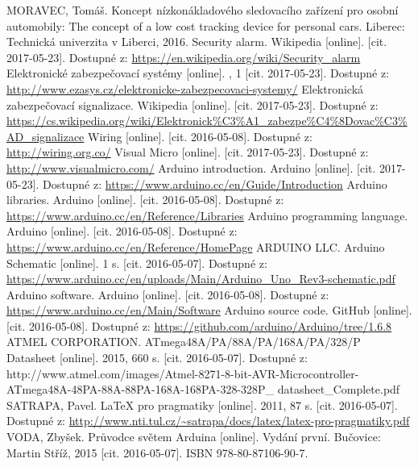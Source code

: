 \documentclass[FM,MP]{tulthesis}  %
\begin{document}
\begin{thebibliography}{10}
MORAVEC, Tomáš. Koncept nízkonákladového sledovacího zařízení pro osobní automobily: The concept of a low cost tracking device for personal cars. Liberec: Technická univerzita v Liberci, 2016.
Security alarm. Wikipedia [online]. [cit. 2017-05-23]. Dostupné z: \url{https://en.wikipedia.org/wiki/Security_alarm}
Elektronické zabezpečovací systémy [online]. , 1 [cit. 2017-05-23]. Dostupné z: \url{http://www.ezasys.cz/elektronicke-zabezpecovaci-systemy/}
Elektronická zabezpečovací signalizace. Wikipedia [online]. [cit. 2017-05-23]. Dostupné z: \url{https://cs.wikipedia.org/wiki/Elektronick\%C3\%A1\_zabezpe\%C4\%8Dovac\%C3\%AD_signalizace}
Wiring [online]. [cit. 2016-05-08]. Dostupné z: \url{http://wiring.org.co/}
Visual Micro [online]. [cit. 2017-05-23]. Dostupné z: \url{http://www.visualmicro.com/}
Arduino introduction. Arduino [online]. [cit. 2017-05-23]. Dostupné z: \url{https://www.arduino.cc/en/Guide/Introduction}
Arduino libraries. Arduino [online]. [cit. 2016-05-08]. Dostupné z: \url{https://www.arduino.cc/en/Reference/Libraries}
Arduino programming language. Arduino [online]. [cit. 2016-05-08]. Dostupné z: \url{https://www.arduino.cc/en/Reference/HomePage}
ARDUINO LLC. Arduino Schematic [online]. 1 s. [cit. 2016-05-07]. Dostupné z: \url{https://www.arduino.cc/en/uploads/Main/Arduino\_Uno\_Rev3-schematic.pdf}
 Arduino software. Arduino [online]. [cit. 2016-05-08]. Dostupné z: \url{https://www.arduino.cc/en/Main/Software}
Arduino source code. GitHub [online]. [cit. 2016-05-08]. Dostupné z: \url{https://github.com/arduino/Arduino/tree/1.6.8}
ATMEL CORPORATION. ATmega48A/PA/88A/PA/168A/PA/328/P Datasheet [online]. 2015, 660 s. [cit. 2016-05-07]. Dostupné z: http://www.atmel.com/images/Atmel-8271-8-bit-AVR-Microcontroller-ATmega48A-48PA-88A-88PA-168A-168PA-328-328P\_ datasheet\_Complete.pdf
SATRAPA, Pavel. LaTeX pro pragmatiky [online]. 2011, 87 s. [cit. 2016-05-07]. Dostupné z: \url{http://www.nti.tul.cz/~satrapa/docs/latex/latex-pro-pragmatiky.pdf}
VODA, Zbyšek. Průvodce světem Arduina [online]. Vydání první. Bučovice: Martin Stříž, 2015 [cit. 2016-05-07]. ISBN 978-80-87106-90-7.

\end{thebibliography}
\end{document}
